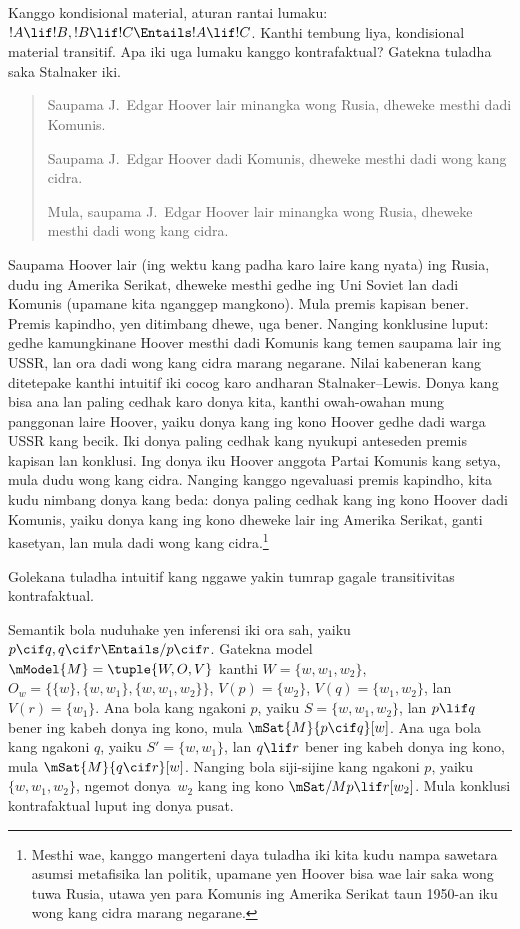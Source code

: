 \documentclass[../../../include/open-logic-section]{subfiles}
\begin{document}


Kanggo kondisional material, aturan rantai lumaku: $!A \lif !B, !B
\lif !C \Entails !A \lif !C$. Kanthi tembung liya, kondisional
material transitif. Apa iki uga lumaku kanggo kontrafaktual?
Gatekna tuladha saka Stalnaker iki.
\begin{quote}
  Saupama J.~Edgar Hoover lair minangka wong Rusia, dheweke mesthi dadi Komunis.

  Saupama J.~Edgar Hoover dadi Komunis, dheweke mesthi dadi wong kang cidra.

  Mula, saupama J.~Edgar Hoover lair minangka wong Rusia,
  dheweke mesthi dadi wong kang cidra.
\end{quote}
Saupama Hoover lair (ing wektu kang padha karo laire kang nyata)
ing Rusia, dudu ing Amerika Serikat, dheweke mesthi gedhe ing
Uni Soviet lan dadi Komunis (upamane kita nganggep mangkono).
Mula premis kapisan bener. Premis kapindho, yen ditimbang dhewe,
uga bener. Nanging konklusine luput: gedhe kamungkinane Hoover
mesthi dadi Komunis kang temen saupama lair ing USSR, lan ora
dadi wong kang cidra marang negarane. Nilai kabeneran kang ditetepake kanthi intuitif iki cocog karo
andharan Stalnaker--Lewis.
Donya kang bisa ana lan paling cedhak karo donya kita, kanthi
owah-owahan mung panggonan laire Hoover, yaiku donya kang ing
kono Hoover gedhe dadi warga USSR kang becik. Iki donya paling
cedhak kang nyukupi anteseden premis kapisan lan konklusi.
Ing donya iku Hoover anggota Partai Komunis kang setya, mula
dudu wong kang cidra. Nanging kanggo ngevaluasi premis kapindho,
kita kudu nimbang donya kang beda: donya paling cedhak kang
ing kono Hoover dadi Komunis, yaiku donya kang ing kono dheweke
lair ing Amerika Serikat, ganti kasetyan, lan mula dadi
wong kang cidra.\footnote{Mesthi wae, kanggo mangerteni daya tuladha
  iki kita kudu nampa sawetara asumsi metafisika lan politik,
  upamane yen Hoover bisa wae lair saka wong tuwa Rusia, utawa
  yen para Komunis ing Amerika Serikat taun 1950-an iku
  wong kang cidra marang negarane.}

\begin{prob}
  Golekana tuladha intuitif kang nggawe yakin tumrap gagale
  transitivitas kontrafaktual.
\end{prob}

\begin{ex}
  Semantik bola nuduhake yen inferensi iki ora sah, yaiku $p
  \cif q, q \cif r \Entails/ p \cif r$. Gatekna model
  $\mModel{M} = \tuple{W, O, V}$ kanthi $W = \{w, w_1, w_2\}$,
  $O_w = \{\{w\}, \{w, w_1\}, \{w, w_1, w_2\}\}$,
  $V(p) = \{w_2\}$, $V(q) = \{w_1, w_2\}$, lan $V(r) = \{w_1\}$.
  Ana bola kang ngakoni $p$, yaiku $S = \{w, w_1, w_2\}$, lan
  $p \lif q$ bener ing kabeh donya ing kono, mula
  $\mSat{M}{p \cif q}[w]$. Ana uga bola kang ngakoni $q$, yaiku
  $S' = \{w, w_1\}$, lan $q \lif r$ bener ing kabeh donya ing
  kono, mula $\mSat{M}{q \cif r}[w]$. Nanging bola siji-sijine
  kang ngakoni $p$, yaiku $\{w, w_1, w_2\}$, ngemot donya~$w_2$
  kang ing kono $\mSat/{M}{p \lif r}[w_2]$. Mula konklusi
  kontrafaktual luput ing donya pusat.
\end{ex}
\end{document}

